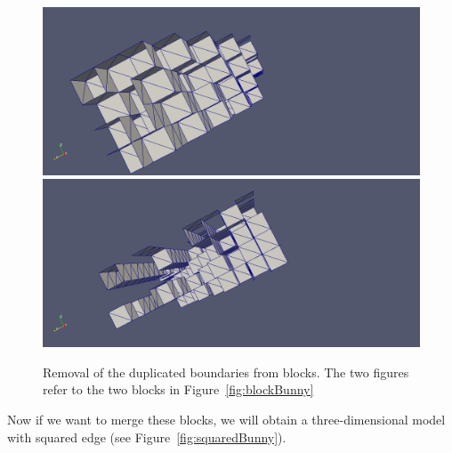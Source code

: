 \begin{figure}[htb] %
   \centering
   \includegraphics[width=0.49\linewidth]{images/BunnyNoBoundary0.png}\hfill
   \includegraphics[width=0.49\linewidth]{images/BunnyNoBoundary1.png}
   \caption[Removal of duplicated boundaries from blocks]{Removal of the duplicated boundaries from blocks. The two figures refer to the two blocks in Figure~\ref{fig:blockBunny}}
   \label{fig:boundaryBunny}
\end{figure}

Now if we want to merge these blocks, we will obtain a three-dimensional model with squared edge (see Figure~\ref{fig:squaredBunny}).

